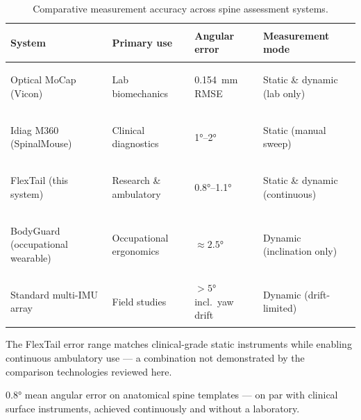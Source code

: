 \begin{table}[ht]
	\centering
	\caption{Comparative measurement accuracy across spine assessment systems.}
	\label{tab:accuracy}
	\small
	\begin{tabularx}{\textwidth}{%
		>{\bfseries\raggedright\arraybackslash}p{42mm}%
		>{\raggedright\arraybackslash}p{27mm}%
		>{\raggedright\arraybackslash}X%
		>{\raggedright\arraybackslash}X}
		\toprule
		System                                          & Primary use             & Angular error & Measurement mode \\
		\midrule
		\rowcolor{rowgray}
		Optical \acs{MoCap} (Vicon)                     & Lab biomechanics        &
		\SI{0.154}{\milli\metre} RMSE~\cite{vicon_rmse} &
		Static \& dynamic (lab only)                                                                                 \\
		Idiag M360 (SpinalMouse)                        & Clinical diagnostics    &
		\ang{1}--\ang{2}~\cite{spinalMouse}             &
		Static (manual sweep)                                                                                        \\
		\rowcolor{rowgray}
		FlexTail (this system)                          & Research \& ambulatory  &
		\ang{0.8}--\ang{1.1}~\cite{walkling2025}        &
		Static \& dynamic (continuous)                                                                               \\
		BodyGuard (occupational wearable)               & Occupational ergonomics &
		$\approx\ang{2.5}$                              &
		Dynamic (inclination only)                                                                                   \\
		\rowcolor{rowgray}
		Standard multi-IMU array                        & Field studies           &
		$>\ang{5}$ incl.\ yaw drift~\cite{madgwick2011} &
		Dynamic (drift-limited)                                                                                      \\
		\bottomrule
	\end{tabularx}
\end{table}

The FlexTail error range matches clinical-grade static instruments while enabling
continuous ambulatory use --- a combination not demonstrated by the comparison
technologies reviewed here.

\begin{factboxfire}
    \ang{0.8} mean angular error on anatomical spine templates --- on par with
    clinical surface instruments, achieved continuously and without a laboratory.
\end{factboxfire}

